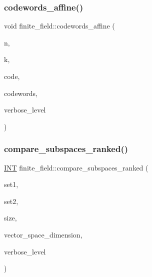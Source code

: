 \mbox{\label{classfinite__field_ae2f4fc9a606f84aaf0814bd197633825}} 
\subsubsection{\texorpdfstring{codewords\+\_\+affine()}{codewords\_affine()}}
{\footnotesize\ttfamily void finite\+\_\+field\+::codewords\+\_\+affine (\begin{DoxyParamCaption}\item[{\mbox{\hyperlink{galois_8h_a09fddde158a3a20bd2dcadb609de11dc}{I\+NT}}}]{n,  }\item[{\mbox{\hyperlink{galois_8h_a09fddde158a3a20bd2dcadb609de11dc}{I\+NT}}}]{k,  }\item[{\mbox{\hyperlink{galois_8h_a09fddde158a3a20bd2dcadb609de11dc}{I\+NT}} $\ast$}]{code,  }\item[{\mbox{\hyperlink{galois_8h_a09fddde158a3a20bd2dcadb609de11dc}{I\+NT}} $\ast$}]{codewords,  }\item[{\mbox{\hyperlink{galois_8h_a09fddde158a3a20bd2dcadb609de11dc}{I\+NT}}}]{verbose\+\_\+level }\end{DoxyParamCaption})}

\mbox{\label{classfinite__field_afa75b644f7925a53d6943788ee30b9cd}} 
\subsubsection{\texorpdfstring{compare\+\_\+subspaces\+\_\+ranked()}{compare\_subspaces\_ranked()}}
{\footnotesize\ttfamily \mbox{\hyperlink{galois_8h_a09fddde158a3a20bd2dcadb609de11dc}{I\+NT}} finite\+\_\+field\+::compare\+\_\+subspaces\+\_\+ranked (\begin{DoxyParamCaption}\item[{\mbox{\hyperlink{galois_8h_a09fddde158a3a20bd2dcadb609de11dc}{I\+NT}} $\ast$}]{set1,  }\item[{\mbox{\hyperlink{galois_8h_a09fddde158a3a20bd2dcadb609de11dc}{I\+NT}} $\ast$}]{set2,  }\item[{\mbox{\hyperlink{galois_8h_a09fddde158a3a20bd2dcadb609de11dc}{I\+NT}}}]{size,  }\item[{\mbox{\hyperlink{galois_8h_a09fddde158a3a20bd2dcadb609de11dc}{I\+NT}}}]{vector\+\_\+space\+\_\+dimension,  }\item[{\mbox{\hyperlink{galois_8h_a09fddde158a3a20bd2dcadb609de11dc}{I\+NT}}}]{verbose\+\_\+level }\end{DoxyParamCaption})}

